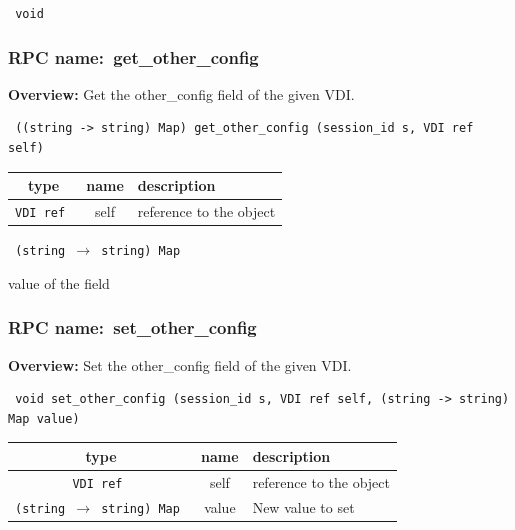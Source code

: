 \vspace{0.3cm}

{\tt 
void
}



\vspace{0.3cm}
\vspace{0.3cm}
\vspace{0.3cm}
\subsubsection{RPC name:~get\_other\_config}

{\bf Overview:} 
Get the other\_config field of the given VDI.

\begin{verbatim} ((string -> string) Map) get_other_config (session_id s, VDI ref self)\end{verbatim}



 
\vspace{0.3cm}
\begin{tabular}{|c|c|p{7cm}|}
 \hline
{\bf type} & {\bf name} & {\bf description} \\ \hline
{\tt VDI ref } & self & reference to the object \\ \hline 

\end{tabular}

\vspace{0.3cm}

{\tt 
(string $\rightarrow$ string) Map
}


value of the field
\vspace{0.3cm}
\vspace{0.3cm}
\vspace{0.3cm}
\subsubsection{RPC name:~set\_other\_config}

{\bf Overview:} 
Set the other\_config field of the given VDI.

\begin{verbatim} void set_other_config (session_id s, VDI ref self, (string -> string) Map value)\end{verbatim}



 
\vspace{0.3cm}
\begin{tabular}{|c|c|p{7cm}|}
 \hline
{\bf type} & {\bf name} & {\bf description} \\ \hline
{\tt VDI ref } & self & reference to the object \\ \hline 

{\tt (string $\rightarrow$ string) Map } & value & New value to set \\ \hline 

\end{tabular}

